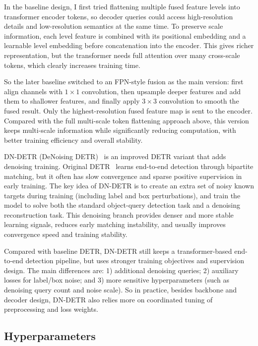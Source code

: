 \documentclass[runningheads]{llncs}
\begin{document}
In the baseline design, I first tried flattening multiple fused feature levels into transformer encoder tokens, so decoder queries could access high-resolution details and low-resolution semantics at the same time. To preserve scale information, each level feature is combined with its positional embedding and a learnable level embedding before concatenation into the encoder. This gives richer representation, but the transformer needs full attention over many cross-scale tokens, which clearly increases training time.

So the later baseline switched to an FPN-style fusion as the main version: first align channels with $1\times1$ convolution, then upsample deeper features and add them to shallower features, and finally apply $3\times3$ convolution to smooth the fused result. Only the highest-resolution fused feature map is sent to the encoder. Compared with the full multi-scale token flattening approach above, this version keeps multi-scale information while significantly reducing computation, with better training efficiency and overall stability.


DN-DETR (DeNoising DETR)~\cite{li2022dndetr} is an improved DETR variant that adds denoising training. Original DETR~\cite{carion2020detr} learns end-to-end detection through bipartite matching, but it often has slow convergence and sparse positive supervision in early training. The key idea of DN-DETR is to create an extra set of noisy known targets during training (including label and box perturbations), and train the model to solve both the standard object-query detection task and a denoising reconstruction task. This denoising branch provides denser and more stable learning signals, reduces early matching instability, and usually improves convergence speed and training stability.

Compared with baseline DETR, DN-DETR still keeps a transformer-based end-to-end detection pipeline, but uses stronger training objectives and supervision design. The main differences are: 1) additional denoising queries; 2) auxiliary losses for label/box noise; and 3) more sensitive hyperparameters (such as denoising query count and noise scale). So in practice, besides backbone and decoder design, DN-DETR also relies more on coordinated tuning of preprocessing and loss weights.

\subsection{Hyperparameters}
\label{sec:hparam}
\end{document}
